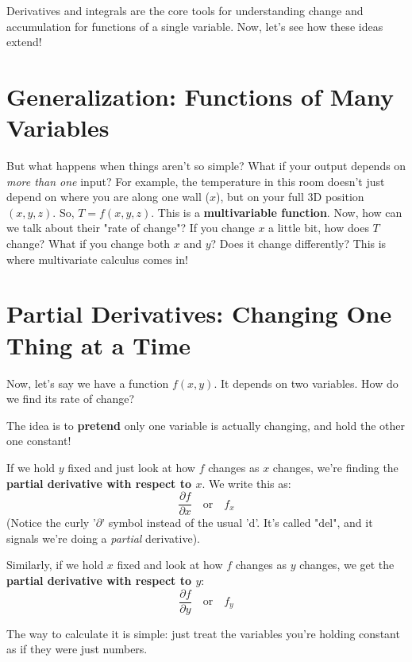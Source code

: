 \documentclass[11pt]{article}
\begin{document}
Derivatives and integrals are the core tools for understanding change and accumulation for functions of a single variable. Now, let's see how these ideas extend!

\section{Generalization: Functions of Many Variables}

But what happens when things aren't so simple? What if your output depends on \emph{more than one} input? For example, the temperature in this room doesn't just depend on where you are along one wall ($x$), but on your full 3D position $(x, y, z)$. So, $T = f(x, y, z)$. This is a \textbf{multivariable function}. Now, how can we talk about their "rate of change"? If you change $x$ a little bit, how does $T$ change? What if you change both $x$ and $y$? Does it change differently? This is where multivariate calculus comes in!

\section{Partial Derivatives: Changing One Thing at a Time}
Now, let's say we have a function $f(x, y)$. It depends on two variables. How do we find its rate of change?

The idea is to \textbf{pretend} only one variable is actually changing, and hold the other one constant!

If we hold $y$ fixed and just look at how $f$ changes as $x$ changes, we're finding the \textbf{partial derivative with respect to $x$}. We write this as:
$$ \frac{\partial f}{\partial x} \quad \text{or} \quad f_x $$
(Notice the curly '$\partial$' symbol instead of the usual 'd'. It's called "del", and it signals we're doing a \emph{partial} derivative).

Similarly, if we hold $x$ fixed and look at how $f$ changes as $y$ changes, we get the \textbf{partial derivative with respect to $y$}:
$$ \frac{\partial f}{\partial y} \quad \text{or} \quad f_y $$

The way to calculate it is simple: just treat the variables you're holding constant as if they were just numbers.
\end{document}
